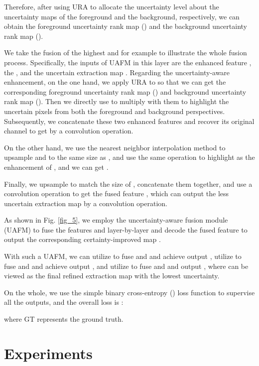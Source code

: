 \documentclass[lettersize,journal]{IEEEtran}
\begin{document}
Therefore, after using URA to allocate the uncertainty level about the uncertainty maps of the foreground and the background, respectively, we can obtain the foreground uncertainty rank map () and the background uncertainty rank map ().


\par
We take the fusion of the highest  and  for example to illustrate the whole fusion process. Specifically, the inputs of UAFM in this layer are the enhanced feature , the , and the uncertain extraction map . Regarding the uncertainty-aware enhancement, on the one hand, we apply URA to  so that we can get the corresponding foreground uncertainty rank map () and background uncertainty rank map (). Then we directly use  to multiply with them to highlight the uncertain pixels from both the foreground and background perspectives. Subsequently, we concatenate these two enhanced features and recover its original channel to get  by a  convolution operation.

On the other hand, we use the nearest neighbor interpolation method to upsample  and  to the same size as , and use the same operation to highlight  as the enhancement of , and we can get . 

Finally, we upsample  to match the size of , concatenate them together, and use a  convolution operation to get the fused feature , which can output the less uncertain extraction map  by a  convolution operation.


\par
As shown in Fig. \ref{fig_5}, we employ the uncertainty-aware fusion module (UAFM) to fuse the features  and  layer-by-layer and decode the fused feature to output the corresponding certainty-improved map .

With such a UAFM, we can utilize  to fuse  and  and achieve output , utilize  to fuse  and  and achieve output , and utilize  to fuse  and  and output , where  can be viewed as the final refined extraction map with the lowest uncertainty.

\par
On the whole, we use the simple binary cross-entropy () loss function to supervise all the outputs, and the overall loss is :

where GT represents the ground truth.

\section{Experiments}
\end{document}
